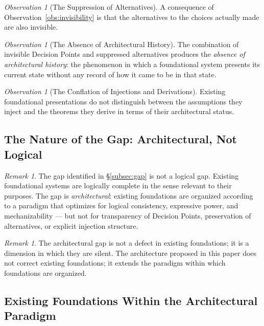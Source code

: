 \documentclass[12pt, a4paper]{article}
\theoremstyle{plain}
\theoremstyle{definition}
\theoremstyle{remark}
\newtheorem{remark}[theorem]{Remark}
\newtheorem{observation}[theorem]{Observation}
\begin{document}
\begin{observation}[The Suppression of Alternatives]
\label{obs:suppression}
A consequence of Observation~\ref{obs:invisibility} is that the
alternatives to the choices actually made are also invisible.
\end{observation}

\begin{observation}[The Absence of Architectural History]
\label{obs:history}
The combination of invisible Decision Points and suppressed
alternatives produces the \emph{absence of architectural history}:
the phenomenon in which a foundational system presents its
current state without any record of how it came to be in that
state.
\end{observation}

\begin{observation}[The Conflation of Injections and Derivations]
\label{obs:conflation}
Existing foundational presentations do not distinguish between
the assumptions they inject and the theorems they derive in terms
of their architectural status.
\end{observation}

\subsection{The Nature of the Gap: Architectural, Not Logical}
\label{subsec:nature}

\begin{remark}
The gap identified in \S\ref{subsec:gap} is not a logical gap.
Existing foundational systems are logically complete in the sense
relevant to their purposes. The gap is \emph{architectural}:
existing foundations are organized according to a paradigm that
optimizes for logical consistency, expressive power, and
mechanizability --- but not for transparency of Decision Points,
preservation of alternatives, or explicit injection structure.
\end{remark}

\begin{remark}
The architectural gap is not a defect in existing foundations;
it is a dimension in which they are silent. The architecture
proposed in this paper does not correct existing foundations;
it extends the paradigm within which foundations are organized.
\end{remark}

\subsection{Existing Foundations Within the Architectural Paradigm}
\label{subsec:existing-in-boma}
\end{document}
